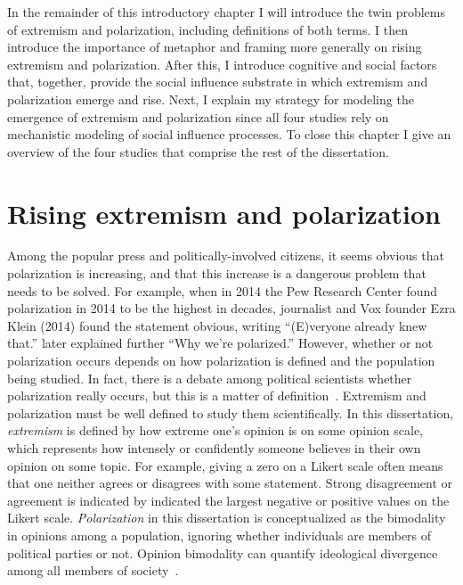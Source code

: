 In the remainder of this introductory chapter I will introduce the 
twin problems of extremism and polarization, including definitions of both
terms. I then introduce the importance of metaphor and framing more generally
on rising extremism and polarization. After this, I introduce cognitive and
social factors that, together, provide the social influence substrate in which extremism 
and polarization emerge and rise. Next, I explain my strategy for modeling the emergence of 
extremism and polarization since all four studies rely on mechanistic modeling
of social influence processes. To close this chapter I give an overview of the
four studies that comprise the rest of the dissertation.


\section{Rising extremism and polarization}

Among the popular press and politically-involved citizens, it seems obvious
that polarization is increasing, and that this increase is a 
dangerous problem that needs to be solved. 
For example, when in 2014 the Pew Research Center found polarization
in 2014 to be the highest in decades, journalist and Vox founder Ezra Klein 
(2014) found the statement obvious, writing ``(E)veryone already knew that.''
 later explained further ``Why we're polarized.'' 
However, whether or not polarization occurs depends on how polarization 
is defined and the population being studied. 
In fact, there is a debate among political scientists whether
polarization really occurs, but this is a matter of definition~\cite{Mason2015,Lelkes2016,Kinder2017}.
Extremism and polarization must be well defined to study them scientifically.
In this dissertation, \emph{extremism} is defined by how extreme one's opinion is on some opinion 
scale, which represents how intensely or confidently someone believes in their
own opinion on some topic.  For example, giving a zero on a Likert scale often means that one 
neither agrees or disagrees with some statement. Strong disagreement or agreement
is indicated by indicated the largest negative or positive values on the Likert
scale.  \emph{Polarization} in this dissertation is 
conceptualized as the bimodality in opinions among a population, ignoring 
whether individuals are members of political parties or not. Opinion bimodality
can quantify ideological divergence among all members of society~\cite{Bramson2016,Lelkes2016}. 

